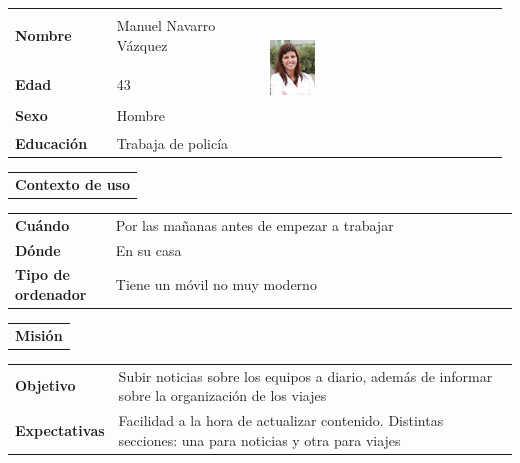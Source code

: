 \documentclass[11pt]{article}
\begin{document}
\begin{table}[H]
  \centering
  \begin{tabular}{p{0.2\linewidth}|p{0.3\linewidth}p{0.475\linewidth}}
    \toprule
    \textbf{Nombre} & Manuel Navarro Vázquez &\multirow{4}{*}{\begin{minipage}{1.\textwidth}\includegraphics[width=0.2\textwidth, height=30mm]{Ana}\end{minipage}}\\\\
    \textbf{Edad} & 43 & \\
    \textbf{Sexo} & Hombre & \\
    \textbf{Educación} & Trabaja de policía & \\
    \bottomrule
  \end{tabular}

  \begin{tabular}{l}
    \textbf{Contexto de uso} 
  \end{tabular}
  
  \begin{tabular}{p{0.2\linewidth}|p{0.8\linewidth}}
    \toprule
    \textbf{Cuándo} & Por las mañanas antes de empezar a trabajar\\
    \textbf{Dónde}  & En su casa\\
    \textbf{Tipo de ordenador} & Tiene un móvil no muy moderno\\
    \bottomrule
  \end{tabular}

  \begin{tabular}{l}
    \textbf{Misión} 
  \end{tabular}
  
  \begin{tabular}{p{0.2\linewidth}|p{0.8\linewidth}}
    \toprule
    \textbf{Objetivo} & Subir noticias sobre los equipos a diario, además de informar sobre la organización de los viajes\\
    \textbf{Expectativas}  & Facilidad a la hora de actualizar contenido. Distintas secciones: una para noticias y otra para viajes \\
    \bottomrule
  \end{tabular}


\end{table}
\end{document}

